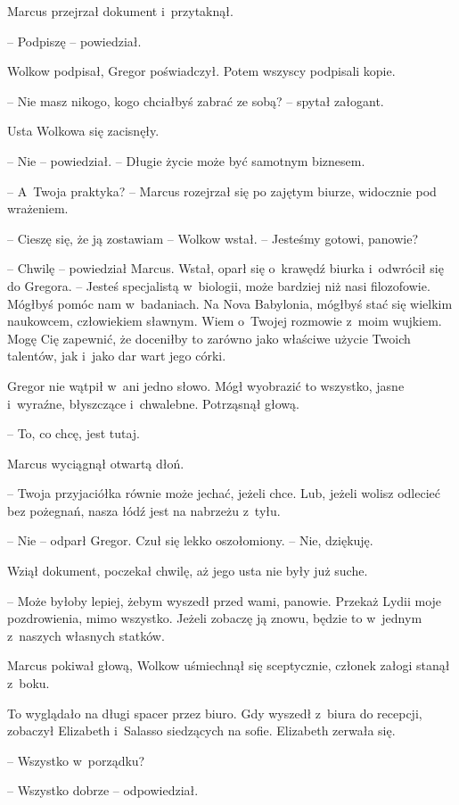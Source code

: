\documentclass[oneside,polish,12pt,sfheadings]{mwbk}
\begin{document}
Marcus przejrzał dokument i~przytaknął.

-- Podpiszę -- powiedział.

Wolkow podpisał, Gregor poświadczył. Potem wszyscy podpisali kopie.

-- Nie masz nikogo, kogo chciałbyś zabrać ze sobą? -- spytał załogant.

Usta Wolkowa się zacisnęły. 

-- Nie -- powiedział. -- Długie życie może być
samotnym biznesem.

-- A~Twoja praktyka? -- Marcus rozejrzał się po zajętym biurze, widocznie
pod wrażeniem.

-- Cieszę się, że ją zostawiam -- Wolkow wstał. -- Jesteśmy gotowi,
panowie?

-- Chwilę -- powiedział Marcus. Wstał, oparł się o~krawędź biurka i~odwrócił się do Gregora. -- Jesteś specjalistą w~biologii, może bardziej
niż nasi filozofowie. Mógłbyś pomóc nam w~badaniach. Na Nova Babylonia,
mógłbyś stać się wielkim naukowcem, człowiekiem sławnym. Wiem o~Twojej
rozmowie z~moim wujkiem. Mogę Cię zapewnić, że doceniłby to zarówno jako
właściwe użycie Twoich talentów, jak i~jako dar wart jego córki.

Gregor nie wątpił w~ani jedno słowo. Mógł wyobrazić to wszystko, jasne i~wyraźne, błyszczące i~chwalebne. Potrząsnął głową.

-- To, co chcę, jest tutaj.

Marcus wyciągnął otwartą dłoń.

-- Twoja przyjaciółka równie może jechać, jeżeli chce. Lub, jeżeli wolisz
odlecieć bez pożegnań, nasza łódź jest na nabrzeżu z~tyłu.

-- Nie -- odparł Gregor. Czuł się lekko oszołomiony. -- Nie, dziękuję.

Wziął dokument, poczekał chwilę, aż jego usta nie były już suche.

-- Może byłoby lepiej, żebym wyszedł przed wami, panowie. Przekaż Lydii
moje pozdrowienia, mimo wszystko. Jeżeli zobaczę ją znowu, będzie to w~jednym z~naszych własnych statków.

Marcus pokiwał głową, Wolkow uśmiechnął się sceptycznie, członek załogi
stanął z~boku.

To wyglądało na długi spacer przez biuro. Gdy wyszedł z~biura do
recepcji, zobaczył Elizabeth i~Salasso siedzących na sofie. Elizabeth
zerwała się.

-- Wszystko w~porządku?

-- Wszystko dobrze -- odpowiedział.
\end{document}

